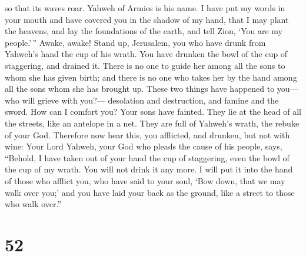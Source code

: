 so that its waves roar. Yahweh of Armies is his name.  I
have put my words in your mouth and have covered you in the shadow of my
hand, that I may plant the heavens, and lay the foundations of the
earth, and tell Zion, `You are my people.'\,''  Awake,
awake! Stand up, Jerusalem, you who have drunk from Yahweh's hand the
cup of his wrath. You have drunken the bowl of the cup of staggering,
and drained it.  There is no one to guide her among all the
sons to whom she has given birth; and there is no one who takes her by
the hand among all the sons whom she has brought up.  These
two things have happened to you--- who will grieve with you?---
desolation and destruction, and famine and the sword. How can I comfort
you?  Your sons have fainted. They lie at the head of all
the streets, like an antelope in a net. They are full of Yahweh's wrath,
the rebuke of your God.  Therefore now hear this, you
afflicted, and drunken, but not with wine:  Your Lord
Yahweh, your God who pleads the cause of his people, says, ``Behold, I
have taken out of your hand the cup of staggering, even the bowl of the
cup of my wrath. You will not drink it any more.  I will
put it into the hand of those who afflict you, who have said to your
soul, `Bow down, that we may walk over you;' and you have laid your back
as the ground, like a street to those who walk over.''

\hypertarget{section-48}{%
\section{52}\label{section-48}}


